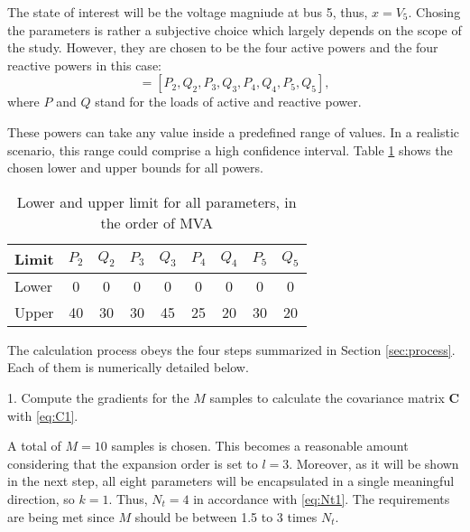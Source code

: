 The state of interest will be the voltage magniude at bus 5, thus, $x=V_5$. Chosing the parameters is rather a subjective choice which largely depends on the scope of the study. However, they are chosen to be the four active powers and the four reactive powers in this case:
\begin{equation}
  [p_1,p_2,p_3,p_4,p_5,p_6,p_7,p_8] = [P_2,Q_2,P_3,Q_3,P_4,Q_4,P_5,Q_5],
  \label{eq:params}
\end{equation}
where $P$ and $Q$ stand for the loads of active and reactive power. 

These powers can take any value inside a predefined range of values. In a realistic scenario, this range could comprise a high confidence interval. Table \ref{tab:lowup} shows the chosen lower and upper bounds for all powers.  

\begin{table}[!htb]
  \centering
  \begin{tabular}{lcccccccc}
    \hline
    Limit & $P_2$ & $Q_2$ & $P_3$ & $Q_3$ & $P_4$ & $Q_4$ & $P_5$ & $Q_5$ \\
    \hline
    Lower & 0 & 0 & 0 & 0 & 0 & 0 & 0 & 0 \\
    Upper & 40 & 30 & 30 & 45 & 25 & 20 & 30 & 20 \\
    \hline
  \end{tabular}
  \caption{Lower and upper limit for all parameters, in the order of MVA}
  \label{tab:lowup}
\end{table}
The calculation process obeys the four steps summarized in Section \ref{sec:process}. Each of them is numerically detailed below. 

\hspace{0.32cm} 1. Compute the gradients for the $M$ samples to calculate the covariance matrix $\mathbf{C}$ with \eqref{eq:C1}. 

A total of $M=10$ samples is chosen. This becomes a reasonable amount considering that the expansion order is set to $l=3$. Moreover, as it will be shown in the next step, all eight parameters will be encapsulated in a single meaningful direction, so $k=1$. Thus, $N_t = 4$ in accordance with \eqref{eq:Nt1}. The requirements are being met since $M$ should be between 1.5 to 3 times $N_t$.

